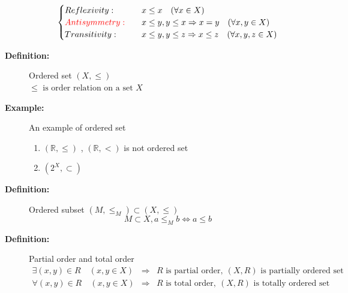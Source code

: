 \documentclass[english,dvipdfmx]{jsarticle}
\begin{document}
\begin{description}
    \begin{equation*}
    \begin{cases}
        Reflexivity : \quad &x\leq x \quad ( \forall x \in X )  \\
        \color{red} Antisymmetry : \quad  &x\leq y ,y\leq x \Rightarrow x=y \quad ( \forall x,y \in X ) \\
        Transitivity : \quad &x\leq y , y\leq z \Rightarrow x\leq z \quad (\forall x,y,z \in X )
    \end{cases}
    \end{equation*}
    \item[\bf{Definition:}] Ordered set $(X , \leq)$ \\
        $\leq \text{ is order relation on a set }X$ 
    \item[\bf{Example:}] An example of ordered set
    \begin{enumerate}
        \item $ (\mathbb{R},\leq) $ , $ (\mathbb{R},<) $ is not ordered set
        \item $ ( 2^X,\subset) $
    \end{enumerate}
    \item[\bf{Definition:}] Ordered subset $(M,\leq_M) \subset (X, \leq)$
    \begin{equation*} 
        M \subset X , a \leq_M b \Leftrightarrow a \leq b
    \end{equation*}
    \item[\bf{Definition:}] Partial order and total order
    \begin{eqnarray*} 
        \exists (x,y) \in R \quad ( x,y \in X ) &\Rightarrow& R \text{ is partial order} ,\ (X , R) \text{ is partially ordered set} \\
        \forall (x,y) \in R \quad ( x,y \in X ) &\Rightarrow& R \text{ is total order} ,\ (X , R) \text{ is totally ordered set}
    \end{eqnarray*}
\end{description}
\newpage
\end{document}
